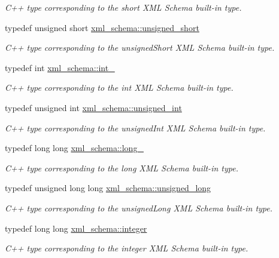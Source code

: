 \begin{DoxyCompactItemize}
\begin{DoxyCompactList}\small\item\em C++ type corresponding to the short X\+M\+L Schema built-\/in type. \end{DoxyCompactList}\item 
typedef unsigned short \hyperlink{namespacexml__schema_a7fc7b4a846c512c370346e15dfdcecaa}{xml\+\_\+schema\+::unsigned\+\_\+short}
\begin{DoxyCompactList}\small\item\em C++ type corresponding to the unsigned\+Short X\+M\+L Schema built-\/in type. \end{DoxyCompactList}\item 
typedef int \hyperlink{namespacexml__schema_acfa24ac68e1a188e7f44c36f7a158bf4}{xml\+\_\+schema\+::int\+\_\+}
\begin{DoxyCompactList}\small\item\em C++ type corresponding to the int X\+M\+L Schema built-\/in type. \end{DoxyCompactList}\item 
typedef unsigned int \hyperlink{namespacexml__schema_a85ca3205d8af287e149aac54535f57e7}{xml\+\_\+schema\+::unsigned\+\_\+int}
\begin{DoxyCompactList}\small\item\em C++ type corresponding to the unsigned\+Int X\+M\+L Schema built-\/in type. \end{DoxyCompactList}\item 
typedef long long \hyperlink{namespacexml__schema_a1d78aacee49e26cb7a69d5aa97df1268}{xml\+\_\+schema\+::long\+\_\+}
\begin{DoxyCompactList}\small\item\em C++ type corresponding to the long X\+M\+L Schema built-\/in type. \end{DoxyCompactList}\item 
typedef unsigned long long \hyperlink{namespacexml__schema_a4413fbcf4c65ffc7aaafe465d72fcb33}{xml\+\_\+schema\+::unsigned\+\_\+long}
\begin{DoxyCompactList}\small\item\em C++ type corresponding to the unsigned\+Long X\+M\+L Schema built-\/in type. \end{DoxyCompactList}\item 
typedef long long \hyperlink{namespacexml__schema_aaaea7c8ce4dfbe26cc52c91c29c97b7c}{xml\+\_\+schema\+::integer}
\begin{DoxyCompactList}\small\item\em C++ type corresponding to the integer X\+M\+L Schema built-\/in type. \end{DoxyCompactList}\item 

\end{DoxyCompactItemize}
